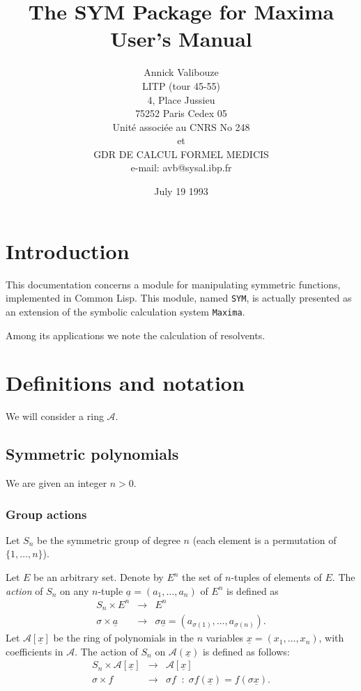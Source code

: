 \documentclass[11pt]{article}
\title{The SYM Package for Maxima \\ User's Manual}
\author{Annick Valibouze\\
LITP (tour 45-55)\\
4, Place Jussieu\\
75252 Paris Cedex 05\\
Unit\'e associ\'ee au CNRS No 248\\
et\\
GDR DE CALCUL FORMEL MEDICIS\\
\small{e-mail: avb@sysal.ibp.fr}}
\date{July 19 1993}
\begin{document}
\maketitle

\tableofcontents 
\newpage
\noindent

\section{Introduction}

This documentation concerns a module for manipulating symmetric functions,
implemented in Common Lisp. This module, named \texttt{SYM}, is actually
presented as an extension of the symbolic calculation system \texttt{Maxima}.

Among its applications we note the calculation of resolvents.


\section{Definitions and notation}

We will consider a ring $\mathcal{A}$.

\subsection{Symmetric polynomials}

We are given an integer $n>0$.

\subsubsection{Group actions}

Let $S_n$ be the symmetric group of degree $n$ (each element is a permutation of
$\{1,\dots,n\}$).

Let $E$ be an arbitrary set. Denote by $E^n$ the set of $n$-tuples of elements
of $E$.  The \emph{action} of $S_n$ on any $n$-tuple $\underline
a=(a_1,\ldots,a_n)$ of $E^n$ is defined as
\begin{eqnarray*}
  S_n   \times E^n & \longrightarrow &  E^n\\
  \sigma \times {\underline a} & \longrightarrow &
  \sigma{\underline a}=(a_{\sigma (1)},\ldots,a_{\sigma (n)}).
\end{eqnarray*}
Let $\mathcal{A}[\underline x]$ be the ring of polynomials in the $n$ variables
$\underline x=(x_1,\ldots ,x_n)$, with coefficients in $\mathcal{A}$.  The
action of $S_n$ on $\mathcal{A}(\underline x)$ is defined as follows:
\begin{eqnarray*}
  S_n \times \mathcal{A}[\underline x] & \longrightarrow &
  \mathcal{A}[\underline x] \\
  \sigma \times f  & \longrightarrow &  \sigma f \;\; :\;
  \sigma f({\underline x}) = f(\sigma{\underline x}).
\end{eqnarray*}
\end{document}
